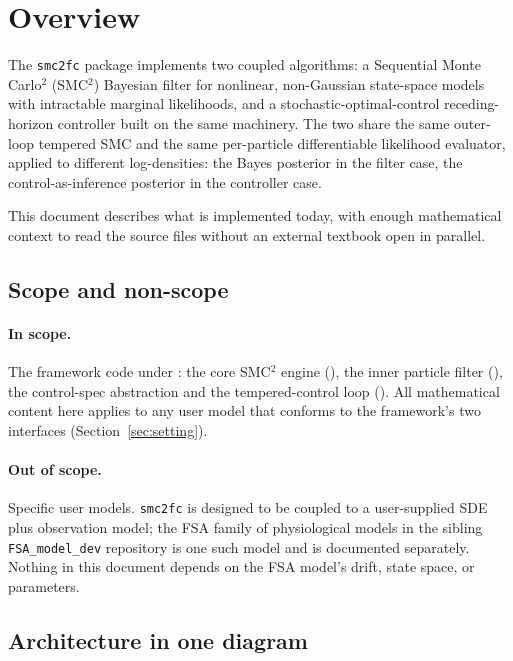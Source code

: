 \section{Overview} \label{sec:overview}

The \texttt{smc2fc} package implements two coupled algorithms: a
Sequential Monte Carlo$^2$ (SMC$^2$) Bayesian filter for nonlinear,
non-Gaussian state-space models with intractable marginal likelihoods,
and a stochastic-optimal-control receding-horizon controller built on
the same machinery. The two share the same outer-loop tempered SMC and
the same per-particle differentiable likelihood evaluator, applied to
different log-densities: the Bayes posterior in the filter case, the
control-as-inference posterior in the controller case.

This document describes what is implemented today, with enough
mathematical context to read the source files without an external
textbook open in parallel.

\subsection{Scope and non-scope}

\paragraph{In scope.} The framework code under
: the core SMC$^2$ engine (), the inner
particle filter (), the control-spec abstraction
and the tempered-control loop (). All
mathematical content here applies to any user model that conforms to
the framework's two interfaces (Section~\ref{sec:setting}).

\paragraph{Out of scope.} Specific user models. \texttt{smc2fc} is
designed to be coupled to a user-supplied SDE plus observation model;
the FSA family of physiological models in the sibling
\texttt{FSA\_model\_dev} repository is one such model and is documented
separately. Nothing in this document depends on the FSA model's drift,
state space, or parameters.

\subsection{Architecture in one diagram} \label{sec:architecture}

